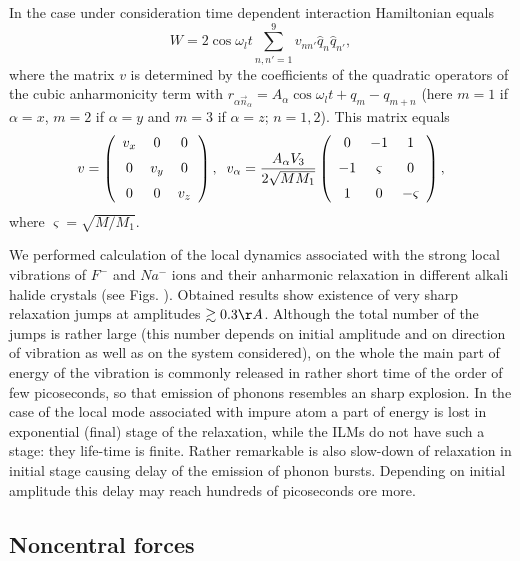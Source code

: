 In the case under consideration time dependent interaction Hamiltonian equals
$$
W = 2 \cos{\omega_l t} \sum_{n,n'=1}^{9}v_{nn'}\hat{q}_n \hat{q}_{n'},
$$
where the matrix $v$ is determined by the coefficients of the quadratic
operators of the cubic anharmonicity term with
$r_{\alpha \vec{n}_{\alpha}} = 
A_{\alpha} \cos{\omega_l t} + q_m - q_{m+n}$
(here $m=1$ if $\alpha = x$, $m=2$ if $\alpha=y$ and $m=3$ if $\alpha=z$; 
$n=1,2$). This matrix equals
\[ v = \left (\begin{array}{ccc}
v_x&0&0\\\noalign{\medskip}
0&v_y&0\\\noalign{\medskip}
0&0&v_z\end{array}
\right ) , \;\;
v_{\alpha} = \frac{A_{\alpha}V_3}{2\sqrt{MM_1}}
\left (\begin{array}{ccc}
0&-1&1\\\noalign{\medskip}
-1&\varsigma&0\\\noalign{\medskip}
1&0&-\varsigma\end{array}
\right ) , \]
where $\varsigma = \sqrt{M/M_1}$.

We performed calculation of the local dynamics associated with the strong 
local vibrations of $F^-$ and $Na^-$ ions and their anharmonic relaxation in  
different alkali halide crystals (see Figs.  ). 
Obtained results show existence of very sharp relaxation jumps at amplitudes 
$\gtrsim 0.3 \AA$. Although the total number of the jumps is rather large 
(this number depends on initial 
amplitude and on direction of vibration as well as on the system considered),
on the whole the main part of energy 
of the vibration is commonly released in rather short time of the order of few 
picoseconds, so that emission of phonons resembles an sharp explosion. 
In the case of the local mode associated with impure atom
a part of energy is lost in exponential (final) stage of the 
relaxation, while the ILMs do not have such a stage: they life-time is finite.
Rather remarkable is also slow-down of relaxation in initial
stage causing delay of the emission of phonon bursts. Depending on initial 
amplitude this delay may reach hundreds of picoseconds ore more.


\subsection {Noncentral forces}

